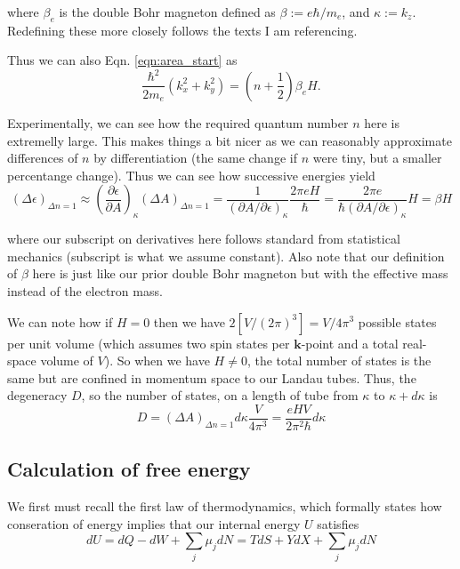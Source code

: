 \documentclass[12pt]{revtex4-2}
\begin{document}
where $\beta_e$ is the double Bohr magneton defined as $\beta := e\hbar/m_e$, and $\kappa := k_z$.  Redefining these more closely follows the texts I am referencing.  

Thus we can also Eqn. \ref{eqn:area_start} as
\begin{equation}
    \frac{\hbar^2}{2m_e}(k_x^2 + k_y^2) = \left(n + \frac{1}{2}\right)\beta_e H.
\end{equation}

Experimentally, we can see how the required quantum number $n$ here is extremelly large. This makes things a bit nicer as we can reasonably approximate differences of $n$ by differentiation (the same change if $n$ were tiny, but a smaller percentange change).  Thus we can see how successive energies yield
\begin{equation}
    (\Delta\epsilon)_{\Delta n=1} \approx \left( \frac{\partial\epsilon}{\partial A} \right)_\kappa (\Delta A)_{\Delta n=1} = \frac{1}{(\partial A/\partial \epsilon)_\kappa}\frac{2\pi eH}{\hbar} = \frac{2\pi e}{\hbar(\partial A/\partial \epsilon)_\kappa}H = \beta H
\end{equation}

where our subscript on derivatives here follows standard from statistical mechanics (subscript is what we assume constant).  Also note that our definition of $\beta$ here is just like our prior double Bohr magneton but with the effective mass instead of the electron mass.
\par
We can note how if $H=0$ then we have $2[V/(2\pi)^3] = V/4\pi^3$ possible states per unit volume (which assumes two spin states per $\mathbf{k}$-point and a total real-space volume of $V$).  So when we have $H \neq 0$, the total number of states is the same but are confined in momentum space to our Landau tubes.  Thus, the degeneracy $D$, so the number of states, on a length of tube from $\kappa$ to $\kappa + d\kappa$ is
\begin{equation}\label{eqn:landau-tube-degeneracy}
    \boxed{ D = (\Delta A)_{\Delta n=1} d\kappa\frac{V}{4\pi^3} = \frac{eHV}{2\pi^2\hbar}d\kappa }
\end{equation}

\subsection{Calculation of free energy}

We first must recall the first law of thermodynamics, which formally states how conseration of energy implies that our internal energy $U$ satisfies
\begin{equation}\label{eqn:first-law}
    dU = dQ - dW + \sum_j \mu_j dN = TdS + YdX + \sum_j \mu_j dN
\end{equation}
\end{document}
